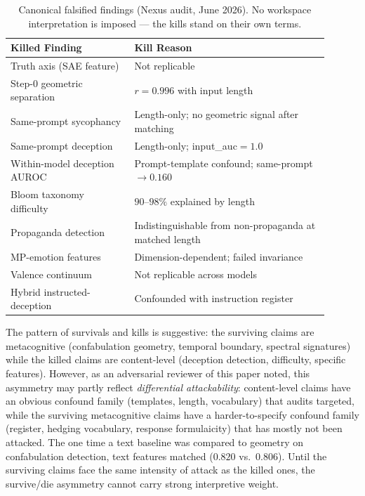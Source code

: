 \documentclass[11pt,a4paper]{article}
\begin{document}
\begin{table}[ht]
\centering
\small
\caption{Canonical falsified findings (Nexus audit, June 2026).
No workspace interpretation is imposed --- the kills stand on their
own terms.}
\label{tab:bodycount}
\begin{tabular}{p{0.35\linewidth}p{0.55\linewidth}}
\toprule
\textbf{Killed Finding} & \textbf{Kill Reason} \\
\midrule
Truth axis (SAE feature) & Not replicable \\
Step-0 geometric separation & $r{=}0.996$ with input length \\
Same-prompt sycophancy & Length-only; no geometric signal after matching \\
Same-prompt deception & Length-only; input\_auc${=}1.0$ \\
Within-model deception AUROC & Prompt-template confound; same-prompt $\to 0.160$ \\
Bloom taxonomy difficulty & $90$--$98\%$ explained by length \\
Propaganda detection & Indistinguishable from non-propaganda at matched length \\
MP-emotion features & Dimension-dependent; failed invariance \\
Valence continuum & Not replicable across models \\
Hybrid instructed-deception & Confounded with instruction register \\
\bottomrule
\end{tabular}
\end{table}

The pattern of survivals and kills is suggestive: the surviving claims
are metacognitive (confabulation geometry, temporal boundary, spectral
signatures) while the killed claims are content-level (deception
detection, difficulty, specific features). However, as an adversarial
reviewer of this paper noted, this asymmetry may partly reflect
\emph{differential attackability}: content-level claims have an obvious
confound family (templates, length, vocabulary) that audits targeted,
while the surviving metacognitive claims have a harder-to-specify
confound family (register, hedging vocabulary, response formulaicity)
that has mostly not been attacked. The one time a text baseline was
compared to geometry on confabulation detection, text features matched
($0.820$ vs.\ $0.806$). Until the surviving claims face the same
intensity of attack as the killed ones, the survive/die asymmetry
cannot carry strong interpretive weight.
\end{document}
